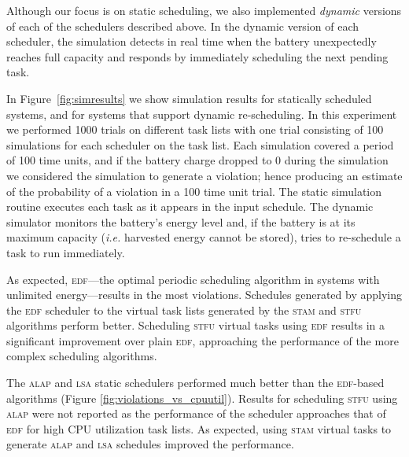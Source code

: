 Although our focus is on static scheduling, we also implemented \emph{dynamic} versions of each of the schedulers described 
above.  In the dynamic version of each scheduler, the simulation detects in real time when the 
battery unexpectedly reaches full capacity and responds by immediately scheduling the next pending task. 


In Figure~\ref{fig:simresults} 
we show simulation results for statically scheduled systems, and for systems that support dynamic re-scheduling.  
In this experiment 
we performed 1000 trials on different task lists
with one trial consisting of 100 simulations for each scheduler on the task list. 
Each simulation covered a period of 100 time units, and if the battery charge dropped to 0 during the simulation we 
considered the simulation to generate a violation; 
hence producing an estimate of the probability of a violation in a 100 time unit trial. 
The static simulation routine executes each task as it appears in the input schedule.  
The dynamic simulator monitors the battery's energy level and, if the battery is at its maximum capacity (\emph{i.e.} harvested energy cannot be stored), tries to re-schedule a task to run immediately.

As expected, \textsc{edf}---the optimal periodic scheduling algorithm in systems with unlimited energy---results in the most violations.  Schedules generated by applying the \textsc{edf} scheduler to the virtual task lists generated by the \textsc{stam} and \textsc{stfu} algorithms perform better.  Scheduling \textsc{stfu} virtual tasks using \textsc{edf} results in a significant improvement over plain \textsc{edf}, approaching the performance of the more complex scheduling algorithms.

The \textsc{alap} and \textsc{lsa} static schedulers performed much better than the \textsc{edf}-based algorithms
(Figure \ref{fig:violations_vs_cpuutil}).
Results for scheduling \textsc{stfu} using \textsc{alap} were not reported as the performance of the scheduler 
approaches that of \textsc{edf} for high CPU utilization task lists.  
As expected, using \textsc{stam} virtual tasks to generate \textsc{alap} and \textsc{lsa} schedules improved the performance.  

